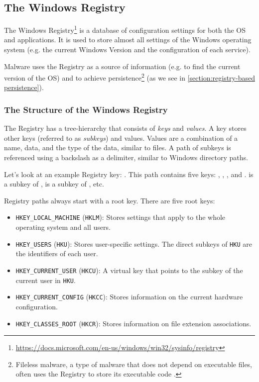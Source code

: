\subsection{The Windows Registry}\label{section:background windows registry}
The Windows Registry\footnote{\tiny \url{https://docs.microsoft.com/en-us/windows/win32/sysinfo/registry}} is a database of configuration settings for both the OS and applications. It is used to store almost all settings of the Windows operating system (e.g. the current Windows Version and the configuration of each service).

Malware uses the Registry as a source of information (e.g. to find the current version of the OS) and to achieve persistence\footnote{Fileless malware, a type of malware that does not depend on executable files, often uses the Registry to store its executable code \cite{fileless-malware}.} (as we see in \autoref{section:registry-based persistence}).

\subsubsection{The Structure of the Windows Registry}
The Registry has a tree-hierarchy that consists of \emph{keys} and \emph{values}. A key stores other keys (referred to as \emph{subkeys}) and values. Values are a combination of a name, data, and the type of the data, similar to files. A path of subkeys is referenced using a backslash as a delimiter, similar to Windows directory paths.

\medskip

Let's look at an example Registry key: . This path contains five keys: , , ,  and .  is a subkey of ,  is a subkey of , etc.

\medskip

Registry paths always start with a root key. There are five root keys:
\begin{itemize}
    \item \texttt{HKEY\_LOCAL\_MACHINE} (\texttt{HKLM}): Stores settings that apply to the whole operating system and all users.
    \item \texttt{HKEY\_USERS} (\texttt{HKU}): Stores user-specific settings. The direct subkeys of \texttt{HKU} are the identifiers of each user.
    \item \texttt{HKEY\_CURRENT\_USER} (\texttt{HKCU}): A virtual key that points to the subkey of the current user in \texttt{HKU}.
    \item \texttt{HKEY\_CURRENT\_CONFIG} (\texttt{HKCC}): Stores information on the current hardware configuration.
    \item \texttt{HKEY\_CLASSES\_ROOT} (\texttt{HKCR}): Stores information on file extension associations.
\end{itemize}

